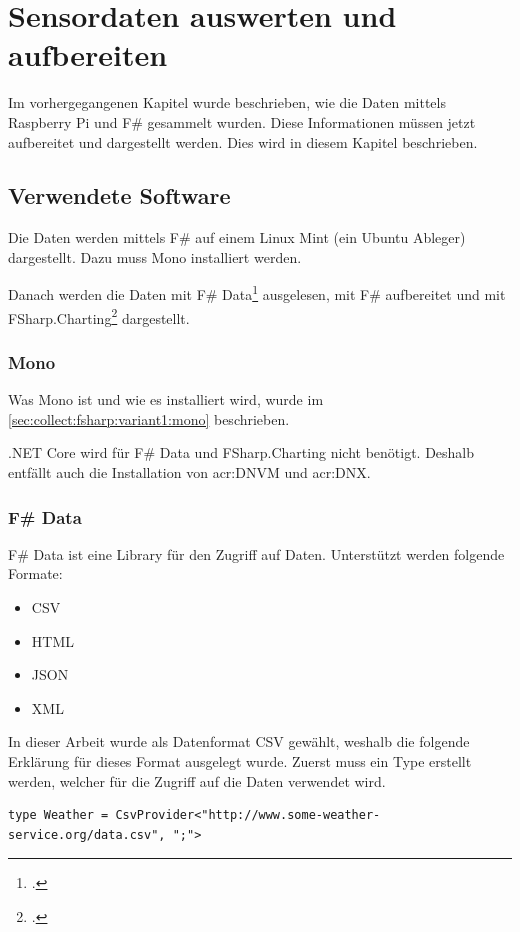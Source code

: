 
\chapter{Sensordaten auswerten und aufbereiten}\label{chap:AnalyseReporting}
Im vorhergegangenen Kapitel wurde beschrieben, wie die Daten mittels Raspberry Pi und F\# gesammelt wurden. Diese Informationen müssen jetzt aufbereitet und dargestellt werden. Dies wird in diesem Kapitel beschrieben.


\section{Verwendete Software}
\label{sec:display:software}
Die Daten werden mittels F\# auf einem Linux Mint (ein Ubuntu Ableger) dargestellt. Dazu muss Mono installiert werden. 

Danach werden die Daten mit F\# Data\footcite{FShaprp_Data_2016-06-17} ausgelesen, mit F\# aufbereitet und mit FSharp.Charting\footcite{FSharp_Charting_2016-06-17} dargestellt.

\subsection{Mono}
Was Mono ist und wie es installiert wird, wurde im \cref{sec:collect:fsharp:variant1:mono}  beschrieben.

.NET Core wird für F\# Data und FSharp.Charting nicht benötigt. Deshalb entfällt auch die Installation von \gls{acr:DNVM} und \gls{acr:DNX}. 

\subsection{F\# Data}
\label{sec:display:software:fsharpdata}
F\# Data ist eine Library für den Zugriff auf Daten. Unterstützt werden folgende Formate:
\begin{itemize}
\item CSV
\item HTML
\item JSON
\item XML
\end{itemize}

In dieser Arbeit wurde als Datenformat CSV gewählt, weshalb die folgende Erklärung für dieses Format ausgelegt wurde.
Zuerst muss ein Type erstellt werden, welcher für die Zugriff auf die Daten verwendet wird.
\begin{lstlisting}
type Weather = CsvProvider<"http://www.some-weather-service.org/data.csv", ";">
\end{lstlisting}

